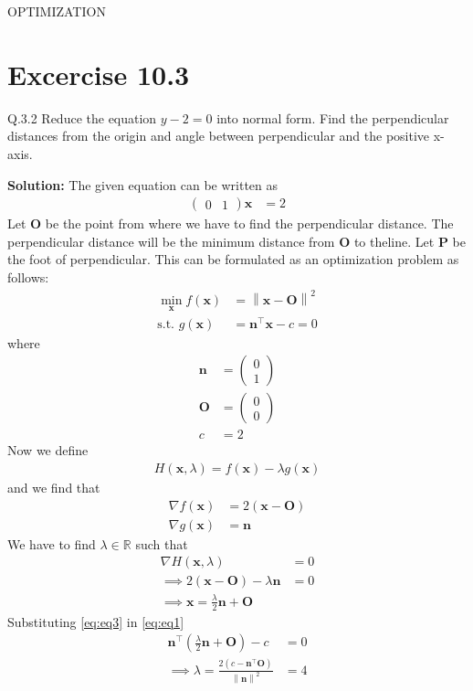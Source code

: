 \documentclass[12pt]{article}
\providecommand{\brak}[1]{\ensuremath{\left(#1\right)}}
\providecommand{\norm}[1]{\left\lVert#1\right\rVert}
\newcommand{\solution}{\noindent \textbf{Solution: }}
\newcommand{\myvec}[1]{\ensuremath{\begin{pmatrix}#1\end{pmatrix}}}
\let\vec\mathbf
\begin{document}
\begin{center}
\textbf\large{OPTIMIZATION}

\end{center}
\section*{Excercise 10.3}

Q.3.2 Reduce the equation $y-2=0$ into normal form. Find the perpendicular distances from the origin and angle between perpendicular and the positive x-axis.

\solution
The given equation can be written as
\begin{align}
	\label{eq:eq1}
	\myvec{0&1}\vec{x} &= 2
\end{align}
Let $\vec{O}$ be the point from where we have to find the perpendicular distance. The perpendicular distance will be the minimum distance from $\vec{O}$ to theline. Let $\vec{P}$ be the foot of perpendicular. This can be formulated as an optimization problem as follows:
\begin{align}
	\min_{\vec{x}}f\brak{\vec{x}} &= \norm{\vec{x}-\vec{O}}^2\\
	\text{s.t. } g\brak{\vec{x}} &= \vec{n}^\top\vec{x}-c=0
\end{align}
where
\begin{align}
	\vec{n} &= \myvec{0\\1}\\
	\vec{O} &= \myvec{0\\0}\\
	c &= 2
\end{align}
Now we define
\begin{align}
	H\brak{\vec{x},\lambda} = f\brak{\vec{x}} - \lambda g\brak{\vec{x}}
\end{align}
and we find that
\begin{align}
	\nabla f\brak{\vec{x}} &= 2\brak{\vec{x}-\vec{O}}\\
	\nabla g\brak{\vec{x}} &= \vec{n}
\end{align}
We have to find $\lambda \in \mathbb{R}$ such that
\begin{align}
	\nabla H\brak{\vec{x},\lambda} &= 0\\
	\label{eq:eq2}
	\implies 2\brak{\vec{x}-\vec{O}}-\lambda\vec{n} &= 0\\
	\label{eq:eq3}
	\implies \vec{x} = \frac{\lambda}{2}\vec{n}+\vec{O}
\end{align}
Substituting \eqref{eq:eq3} in \eqref{eq:eq1}
\begin{align}
	\vec{n}^\top\brak{\frac{\lambda}{2}\vec{n}+\vec{O}} - c &= 0\\
	\implies \lambda = \frac{2\brak{c-\vec{n}^\top\vec{O}}}{\norm{\vec{n}}^2} &= 4
\end{align}
\end{document}
